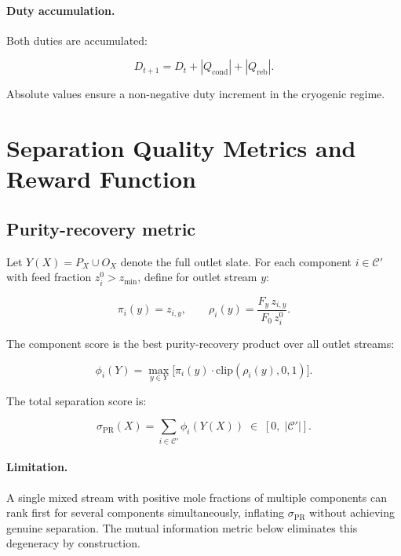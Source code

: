 \documentclass[11pt,a4paper]{article}
\theoremstyle{definition}
\theoremstyle{plain}
\newcommand{\calC}{\mathcal{C}}
\newcommand{\abs}[1]{\left|#1\right|}
\begin{document}
\paragraph{Duty accumulation.}
Both duties are accumulated:

\begin{equation}
 D_{t+1} = D_t + \abs{Q_{\mathrm{cond}}} + \abs{Q_{\mathrm{reb}}}.
\end{equation}

Absolute values ensure a non-negative duty increment in the cryogenic regime.

\section{Separation Quality Metrics and Reward Function}
\label{sec:reward}

\subsection{Purity-recovery metric}
\label{sec:pr_metric}

Let $Y(X) = P_X \cup O_X$ denote the full outlet slate. For each component $i \in \calC'$ with feed fraction $z_i^0 > z_{\min}$, define for outlet stream $y$:

\begin{equation}
 \pi_i(y) = z_{i,y},
 \qquad
 \rho_i(y) = \frac{F_y\, z_{i,y}}{F_0\, z_i^0}.
\end{equation}

The component score is the best purity-recovery product over all outlet streams:

\begin{equation}
 \phi_i(Y) = \max_{y \in Y}
 \bigl[\pi_i(y) \cdot \mathrm{clip}(\rho_i(y), 0, 1)\bigr].
\end{equation}

The total separation score is:

\begin{equation}
 \sigma_{\mathrm{PR}}(X)
 = \sum_{i \in \calC'} \phi_i(Y(X))
 \;\in\; [0,\; \abs{\calC'}].
 \label{eq:sigma_PR}
\end{equation}

\paragraph{Limitation.}
A single mixed stream with positive mole fractions of multiple components can rank first for several components simultaneously, inflating $\sigma_{\mathrm{PR}}$ without achieving genuine separation. The mutual information metric below eliminates this degeneracy by construction.
\end{document}
